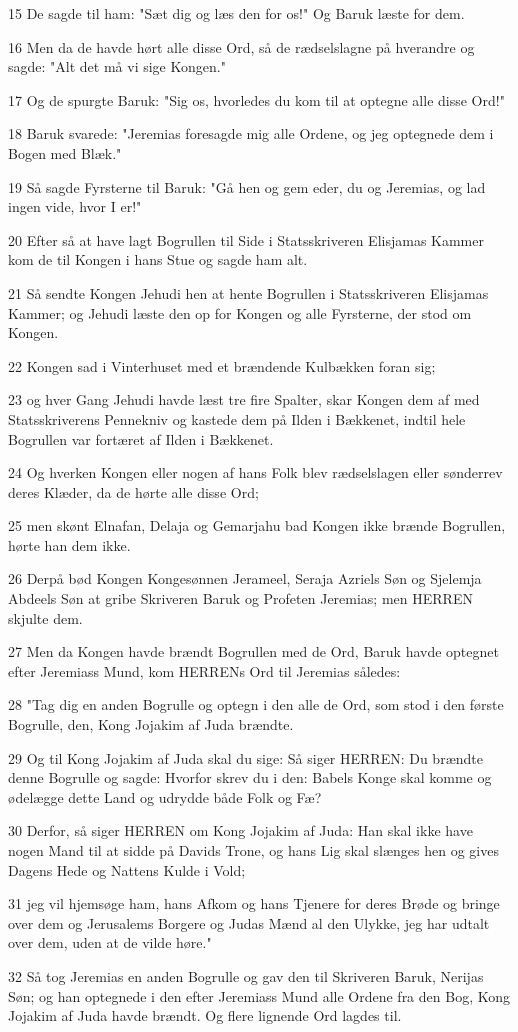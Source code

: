 \par 15 De sagde til ham: "Sæt dig og læs den for os!" Og Baruk læste for dem.
\par 16 Men da de havde hørt alle disse Ord, så de rædselslagne på hverandre og sagde: "Alt det må vi sige Kongen."
\par 17 Og de spurgte Baruk: "Sig os, hvorledes du kom til at optegne alle disse Ord!"
\par 18 Baruk svarede: "Jeremias foresagde mig alle Ordene, og jeg optegnede dem i Bogen med Blæk."
\par 19 Så sagde Fyrsterne til Baruk: "Gå hen og gem eder, du og Jeremias, og lad ingen vide, hvor I er!"
\par 20 Efter så at have lagt Bogrullen til Side i Statsskriveren Elisjamas Kammer kom de til Kongen i hans Stue og sagde ham alt.
\par 21 Så sendte Kongen Jehudi hen at hente Bogrullen i Statsskriveren Elisjamas Kammer; og Jehudi læste den op for Kongen og alle Fyrsterne, der stod om Kongen.
\par 22 Kongen sad i Vinterhuset med et brændende Kulbækken foran sig;
\par 23 og hver Gang Jehudi havde læst tre fire Spalter, skar Kongen dem af med Statsskriverens Pennekniv og kastede dem på Ilden i Bækkenet, indtil hele Bogrullen var fortæret af Ilden i Bækkenet.
\par 24 Og hverken Kongen eller nogen af hans Folk blev rædselslagen eller sønderrev deres Klæder, da de hørte alle disse Ord;
\par 25 men skønt Elnafan, Delaja og Gemarjahu bad Kongen ikke brænde Bogrullen, hørte han dem ikke.
\par 26 Derpå bød Kongen Kongesønnen Jerameel, Seraja Azriels Søn og Sjelemja Abdeels Søn at gribe Skriveren Baruk og Profeten Jeremias; men HERREN skjulte dem.
\par 27 Men da Kongen havde brændt Bogrullen med de Ord, Baruk havde optegnet efter Jeremiass Mund, kom HERRENs Ord til Jeremias således:
\par 28 "Tag dig en anden Bogrulle og optegn i den alle de Ord, som stod i den første Bogrulle, den, Kong Jojakim af Juda brændte.
\par 29 Og til Kong Jojakim af Juda skal du sige: Så siger HERREN: Du brændte denne Bogrulle og sagde: Hvorfor skrev du i den: Babels Konge skal komme og ødelægge dette Land og udrydde både Folk og Fæ?
\par 30 Derfor, så siger HERREN om Kong Jojakim af Juda: Han skal ikke have nogen Mand til at sidde på Davids Trone, og hans Lig skal slænges hen og gives Dagens Hede og Nattens Kulde i Vold;
\par 31 jeg vil hjemsøge ham, hans Afkom og hans Tjenere for deres Brøde og bringe over dem og Jerusalems Borgere og Judas Mænd al den Ulykke, jeg har udtalt over dem, uden at de vilde høre."
\par 32 Så tog Jeremias en anden Bogrulle og gav den til Skriveren Baruk, Nerijas Søn; og han optegnede i den efter Jeremiass Mund alle Ordene fra den Bog, Kong Jojakim af Juda havde brændt. Og flere lignende Ord lagdes til.

